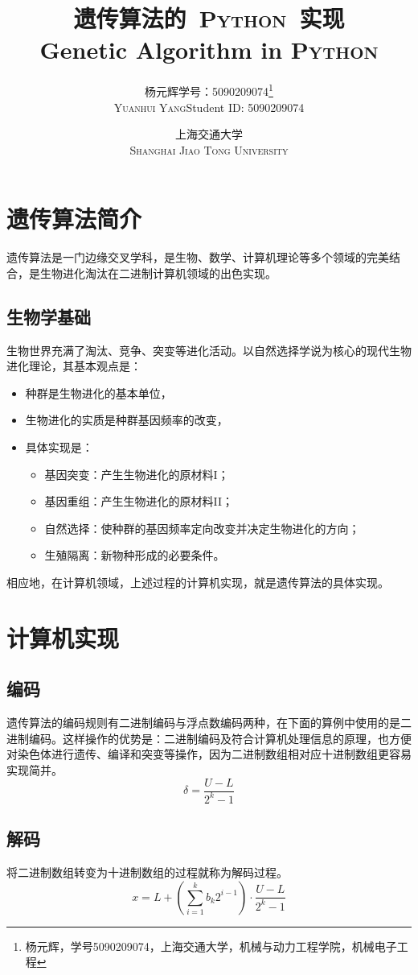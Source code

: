 \documentclass[12pt]{article}
\title{遗传算法的~\textsc{Python}~实现\\
Genetic Algorithm in \textsc{Python}}
\author{\kaishu{}杨元辉\quad 学号：5090209074\thanks{杨元辉，学号5090209074，上海交通大学，机械与动力工程学院，机械电子工程}\\
\textsc{Yuanhui Yang}\quad Student ID: 5090209074}
\date{\kaishu{}上海交通大学\\\textsc{Shanghai Jiao Tong University}}
\begin{document}
\cfoot{}
\rfoot{\thepage}
\maketitle
\thispagestyle{fancy}
\section{遗传算法简介}
遗传算法是一门边缘交叉学科，是生物、数学、计算机理论等多个领域的完美结合，是生物进化淘汰在二进制计算机领域的出色实现。
\subsection{生物学基础}
生物世界充满了淘汰、竞争、突变等进化活动。以自然选择学说为核心的现代生物进化理论，其基本观点是：
\begin{itemize}
\item 种群是生物进化的基本单位，
\item 生物进化的实质是种群基因频率的改变，
\item 具体实现是：
\begin{itemize}
\item 基因突变：产生生物进化的原材料I；
\item 基因重组：产生生物进化的原材料II；
\item 自然选择：使种群的基因频率定向改变并决定生物进化的方向；
\item 生殖隔离：新物种形成的必要条件。
\end{itemize}
\end{itemize}\par
相应地，在计算机领域，上述过程的计算机实现，就是遗传算法的具体实现。
\section{计算机实现}
\subsection{编码}
遗传算法的编码规则有二进制编码与浮点数编码两种，在下面的算例中使用的是二进制编码。这样操作的优势是：二进制编码及符合计算机处理信息的原理，也方便对染色体进行遗传、编译和突变等操作，因为二进制数组相对应十进制数组更容易实现简并。
\begin{equation}
\delta =  \dfrac{U - L}{2^k - 1}
\end{equation}
\subsection{解码}
将二进制数组转变为十进制数组的过程就称为解码过程。
\begin{equation}
x = L + \left(\sum\limits_{i = 1}^{k}{b_k 2^{i-1}}\right)\cdot \dfrac{U-L}{2^k - 1} 
\end{equation}
\end{document}
